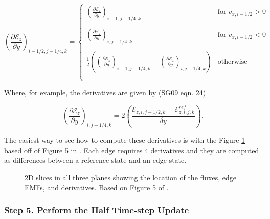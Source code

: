 \begin{equation}
    \label{eqn:emf-upwind-slope}
    \left( \frac{\partial \mathcal{E}_z }{\partial y} \right)_{i-1/2, j-1/4, k} =
        \begin{cases}
            \left( \frac{\partial \mathcal{E}_z }{\partial y} \right)_{i-1, j-1/4, k} & \text{for} \; v_{x, i-1/2} > 0
            \\
            \\
            \left( \frac{\partial \mathcal{E}_z }{\partial y} \right)_{i, j-1/4, k} & \text{for} \; v_{x, i-1/2} < 0
            \\
            \\
            \frac{1}{2} \left( \left( \frac{\partial \mathcal{E}_z }{\partial y} \right)_{i-1, j-1/4, k} + \left( \frac{\partial \mathcal{E}_z }{\partial y} \right)_{i, j-1/4, k} \right) & \text{otherwise}
            \\
            \\
        \end{cases}
\end{equation}

Where, for example, the derivatives are given by (SG09 eqn. 24)

\begin{equation}
    \label{eqn:emf-slope}
    \left( \frac{\partial \mathcal{E}_z }{\partial y} \right)_{i, j-1/4, k} =
    2 \left( \frac{\mathcal{E}_{z,i,j-1/2,k} - \mathcal{E}_{z,i,j,k}^{ref}}{\delta y} \right).
\end{equation}

The easiest way to see how to compute these derivatives is with the Figure \ref{fig:emf-graph} based off of Figure 5 in \cite{stone_athena_2008}. Each edge requires 4 derivatives and they are computed as differences between a reference state and an edge state.

\begin{figure}[ht!]
    \caption{2D slices in all three planes showing the location of the fluxes, edge EMFs, and derivatives. Based on Figure 5 of \cite{stone_athena_2008}.}
    \label{fig:emf-graph}
\end{figure}

\subsubsection{Step 5. Perform the Half Time-step Update}
\label{vlct:half-dt-update}

